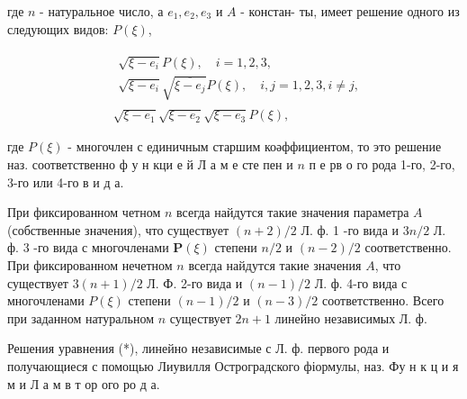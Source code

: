 \documentclass[10pt]{article}
\begin{document}
где $n$ - натуральное число, а $e_{1}, e_{2}, e_{3}$ и $A$ - констан- ты, имеет решение одного из следующих видов: $P(\xi)$,



\[

\begin{aligned}

& \begin{array}{c}

\sqrt{\xi-e_{i}} P(\xi), \quad i=1,2,3, \\

\sqrt{\xi-e_{i}} \sqrt{\overline{\xi-e_{j}}} P(\xi), \quad i, j=1,2,3, i \neq j,

\end{array} \\

& \sqrt{\xi-e_{1}} \sqrt{\xi-e_{2}} \sqrt{\xi-e_{3}} P(\xi),

\end{aligned}

\]



где $P(\xi)$ - многочлен с единичным старшим коәффициентом, то это решение наз. соответственно ф у н кци е й Л а м е сте пен и $n$ п е рв о го рода 1-го, 2-го, 3-го или 4-го в и д а.



При фиксированном четном $n$ всегда найдутся такие значения параметра $A$ (собственные значения), что существует $(n+2) / 2$ Л. ф. 1 -го вида и $3 n / 2$ Л. ф. 3 -го вида с многочленами $\boldsymbol{P}(\xi)$ степени $n / 2$ и $(n-2) / 2$ соответственно. При фиксированном нечетном $n$ всегда найдутся такие значения $A$, что существует $3(n+1) / 2$ Л. Ф. 2-го вида и $(n-1) / 2$ Л. ф. 4-го вида с многочленами $P(\xi)$ степени $(n-1) / 2$ и $(n-3) / 2$ соответственно. Всего при заданном натуральном $n$ существует $2 n+1$ линейно независимых Л. ф.



Решения уравнения (*), линейно независимые с Л. ф. первого рода и получающиеся с помощью Лиувилля Остроградского фіормулы, наз. Фу н к ц и я м и Л а м в т ор ого ро д а.
\end{document}
